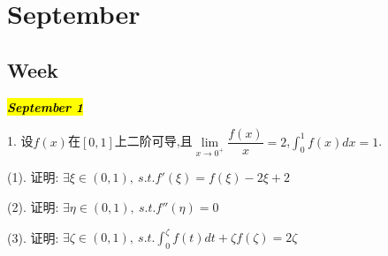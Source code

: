 \chapter{September}
\section{Week }
\hl{\textbf{\textit{September 1}}}

1. 设$f(x)$在$[0,1]$上二阶可导,且$\lim\limits_{x\rightarrow 0^{+}}\dfrac{f(x)}{x}=2$,$\int_{0}^{1}f(x)dx=1$.

(1). 证明:  $\exists \xi\in(0,1),\ s.t. f'(\xi)=f(\xi)-2\xi+2$

(2). 证明:  $\exists \eta\in(0,1),\ s.t. f''(\eta)=0$

(3). 证明:  $\exists \zeta\in(0,1),\ s.t. \int_{0}^{\zeta}f(t)dt+\zeta f(\zeta)=2\zeta$

